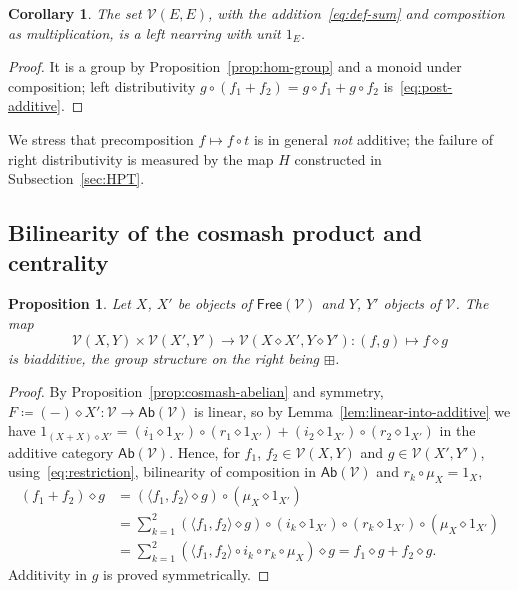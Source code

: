 \documentclass[reqno,a4paper]{amsart}
\theoremstyle{plain}
\newtheorem{proposition}[subsection]{Proposition}
\newtheorem{corollary}[subsection]{Corollary}
\theoremstyle{definition}
\newcommand{\DefEq}{\coloneq}
\newcommand{\V}{\ensuremath{\mathcal{V}}}
\newcommand{\Ab}{\ensuremath{\mathsf{Ab}}}
\newcommand{\Free}{\ensuremath{\mathsf{Free}}}
\newcommand{\cosmash}{\ensuremath{\diamond}}
\begin{document}
\begin{corollary}\label{cor:nearring}
  The set \(\V(E,E)\), with the addition~\eqref{eq:def-sum} and composition as multiplication, is a left nearring with unit \(1_{E}\).
\end{corollary}

\begin{proof}
  It is a group by Proposition~\ref{prop:hom-group} and a monoid under composition; left distributivity \(g\circ(f_{1}+f_{2})=g\circ f_{1}+g\circ f_{2}\) is~\eqref{eq:post-additive}.
\end{proof}

We stress that precomposition \(f\mapsto f\circ t\) is in general \emph{not} additive; the failure of right distributivity is measured by the map \(H\) constructed in Subsection~\ref{sec:HPT}.

\subsection{Bilinearity of the cosmash product and centrality}\label{sec:bilinearity}

\begin{proposition}\label{prop:cosmash-bilinear}
  Let \(X\), \(X'\) be objects of \(\Free(\V)\) and \(Y\), \(Y'\) objects of \(\V\). The map
  \[
    \V(X,Y)\times\V(X',Y')\to\V(X\cosmash X',Y\cosmash Y')\colon (f,g)\mapsto f\cosmash g
  \]
  is biadditive, the group structure on the right being \(\boxplus\).
\end{proposition}

\begin{proof}
  By Proposition~\ref{prop:cosmash-abelian} and symmetry, \(F\DefEq(-)\cosmash X'\colon \V\to\Ab(\V)\) is linear, so by Lemma~\ref{lem:linear-into-additive} we have \(1_{(X+X)\cosmash X'}=(i_{1}\cosmash 1_{X'})\circ(r_{1}\cosmash 1_{X'})+(i_{2}\cosmash 1_{X'})\circ(r_{2}\cosmash 1_{X'})\) in the additive category \(\Ab(\V)\). Hence, for \(f_{1}\), \(f_{2}\in\V(X,Y)\) and \(g\in\V(X',Y')\), using~\eqref{eq:restriction}, bilinearity of composition in \(\Ab(\V)\) and \(r_{k}\circ\mu_{X}=1_{X}\),
  \begin{align*}
    (f_{1}+f_{2})\cosmash g & =(\langle f_{1},f_{2}\rangle\cosmash g)\circ(\mu_{X}\cosmash 1_{X'})                                                                     \\
                            & =\sum_{k=1}^{2}(\langle f_{1},f_{2}\rangle\cosmash g)\circ(i_{k}\cosmash 1_{X'})\circ(r_{k}\cosmash 1_{X'})\circ(\mu_{X}\cosmash 1_{X'}) \\
                            & =\sum_{k=1}^{2}(\langle f_{1},f_{2}\rangle\circ i_{k}\circ r_{k}\circ\mu_{X})\cosmash g=f_{1}\cosmash g+f_{2}\cosmash g\text{.}
  \end{align*}
  Additivity in \(g\) is proved symmetrically.
\end{proof}
\end{document}
